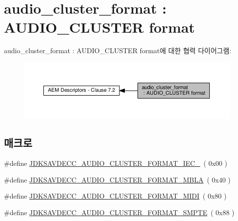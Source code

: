 \hypertarget{group__audio__cluster__format}{}\section{audio\+\_\+cluster\+\_\+format \+: A\+U\+D\+I\+O\+\_\+\+C\+L\+U\+S\+T\+ER format}
\label{group__audio__cluster__format}
audio\+\_\+cluster\+\_\+format \+: A\+U\+D\+I\+O\+\_\+\+C\+L\+U\+S\+T\+ER format에 대한 협력 다이어그램\+:
\nopagebreak
\begin{figure}[H]
\begin{center}
\leavevmode
\includegraphics[width=350pt]{group__audio__cluster__format}
\end{center}
\end{figure}
\subsection*{매크로}
\begin{DoxyCompactItemize}
\item 
\#define \hyperlink{group__audio__cluster__format_ga6c54e49ae6b1addb316522bb56d05638}{J\+D\+K\+S\+A\+V\+D\+E\+C\+C\+\_\+\+A\+U\+D\+I\+O\+\_\+\+C\+L\+U\+S\+T\+E\+R\+\_\+\+F\+O\+R\+M\+A\+T\+\_\+\+I\+E\+C\+\_}~( 0x00 )
\item 
\#define \hyperlink{group__audio__cluster__format_gac64ae9f897cb83fc05c8a4267e1e01b4}{J\+D\+K\+S\+A\+V\+D\+E\+C\+C\+\_\+\+A\+U\+D\+I\+O\+\_\+\+C\+L\+U\+S\+T\+E\+R\+\_\+\+F\+O\+R\+M\+A\+T\+\_\+\+M\+B\+LA}~( 0x40 )
\item 
\#define \hyperlink{group__audio__cluster__format_ga1cae2820ca3dc1fe24a3fe02b64008df}{J\+D\+K\+S\+A\+V\+D\+E\+C\+C\+\_\+\+A\+U\+D\+I\+O\+\_\+\+C\+L\+U\+S\+T\+E\+R\+\_\+\+F\+O\+R\+M\+A\+T\+\_\+\+M\+I\+DI}~( 0x80 )
\item 
\#define \hyperlink{group__audio__cluster__format_ga4128c05956094f2a231dca8c843154a4}{J\+D\+K\+S\+A\+V\+D\+E\+C\+C\+\_\+\+A\+U\+D\+I\+O\+\_\+\+C\+L\+U\+S\+T\+E\+R\+\_\+\+F\+O\+R\+M\+A\+T\+\_\+\+S\+M\+P\+TE}~( 0x88 )
\end{DoxyCompactItemize}


